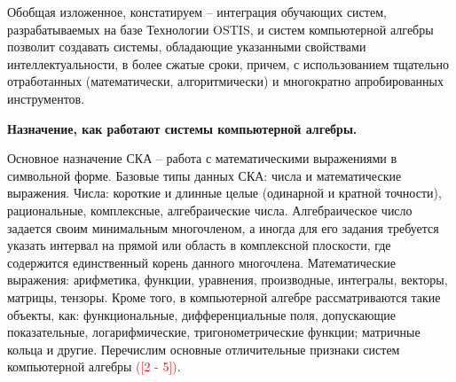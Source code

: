 Обобщая изложенное, констатируем -- интеграция обучающих систем, разрабатываемых на базе Технологии OSTIS, и систем компьютерной алгебры позволит создавать системы, обладающие указанными свойствами интеллектуальности, в более сжатые сроки, причем, с использованием тщательно отработанных (математически, алгоритмически) и многократно апробированных инструментов.

\textbf{Назначение, как работают системы компьютерной алгебры.}

Основное назначение СКА -- работа с математическими выражениями в символьной форме. Базовые типы данных СКА: числа и математические выражения. Числа: короткие и длинные целые (одинарной и кратной точности), рациональные, комплексные, алгебраические числа. Алгебраическое число задается своим минимальным многочленом, а иногда для его задания требуется указать интервал на прямой или область в комплексной плоскости, где содержится единственный корень данного многочлена. Математические выражения: арифметика, функции, уравнения, производные, интегралы, векторы, матрицы, тензоры. Кроме того, в компьютерной алгебре рассматриваются такие объекты, как: функциональные, дифференциальные поля, допускающие показательные, логарифмические, тригонометрические функции; матричные кольца и другие. Перечислим основные отличительные признаки систем компьютерной алгебры \textcolor{red}{([2 - 5])}.

